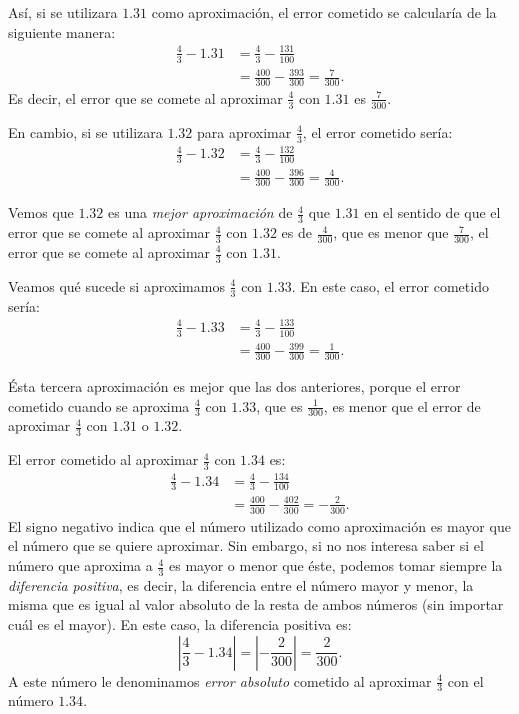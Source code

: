 Así, si se utilizara $1.31$ como aproximación, el error cometido se calcularía de la siguiente
manera:
\begin{align*}
\frac{4}{3} - 1.31 &= \frac{4}{3} - \frac{131}{100} \\
&= \frac{400}{300} - \frac{393}{300} = \frac{7}{300}.
\end{align*}
Es decir, el error que se comete al aproximar $\frac{4}{3}$ con $1.31$ es $\frac{7}{300}$.

En cambio, si se utilizara $1.32$ para aproximar $\frac{4}{3}$, el error cometido sería:
\begin{align*}
\frac{4}{3} - 1.32 &=\frac{4}{3} - \frac{132}{100} \\
&= \frac{400}{300} - \frac{396}{300} = \frac{4}{300}.
\end{align*}

Vemos que $1.32$ es una \emph{mejor aproximación} de $\frac{4}{3}$ que $1.31$ en el sentido de que
el error que se comete al aproximar $\frac{4}{3}$ con $1.32$ es de $\frac{4}{300}$, que es menor
que $\frac{7}{300}$, el error que se comete al aproximar $\frac{4}{3}$ con $1.31$.

Veamos qué sucede si aproximamos $\displaystyle{\frac{4}{3}}$ con $1.33$. En este caso, el error
cometido sería:
\begin{align*}
\frac{4}{3} - 1.33 &=\frac{4}{3} - \frac{133}{100} \\
&= \frac{400}{300} - \frac{399}{300} = \frac{1}{300}.
\end{align*}

Ésta tercera aproximación es mejor que las dos anteriores, porque el error cometido cuando se
aproxima $\frac{4}{3}$ con $1.33$, que es $\frac{1}{300}$, es menor que el error de aproximar
$\frac{4}{3}$ con $1.31$ o $1.32$.

El error cometido al aproximar $\frac{4}{3}$ con $1.34$ es:
\begin{align*}
\frac{4}{3} - 1.34 &=\frac{4}{3} - \frac{134}{100} \\
&= \frac{400}{300} - \frac{402}{300} = -\frac{2}{300}.
\end{align*}
El signo negativo indica que el número utilizado como aproximación es mayor que el número que se
quiere aproximar. Sin embargo, si no nos interesa saber si el número que aproxima a $\frac{4}{3}$
es mayor o menor que éste, podemos tomar siempre la \textit{diferencia positiva}, es decir, la
diferencia entre el número mayor y menor, la misma que es igual al valor absoluto de la resta de
ambos números (sin importar cuál es el mayor). En este caso, la diferencia positiva es:
\[
\left|\frac{4}{3} - 1.34\right| = \left|-\frac{2}{300}\right| = \frac{2}{300}.
\]
A este número le denominamos \emph{error absoluto} cometido al aproximar $\frac{4}{3}$ con el
número $1.34$.

